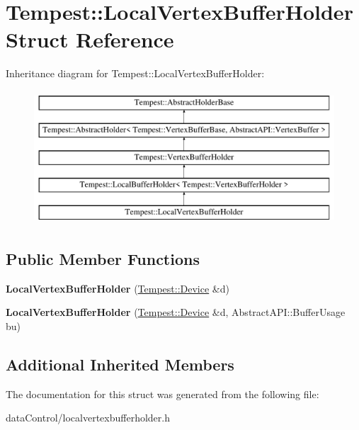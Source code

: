 \hypertarget{struct_tempest_1_1_local_vertex_buffer_holder}{\section{Tempest\+:\+:Local\+Vertex\+Buffer\+Holder Struct Reference}
\label{struct_tempest_1_1_local_vertex_buffer_holder}
}
Inheritance diagram for Tempest\+:\+:Local\+Vertex\+Buffer\+Holder\+:\begin{figure}[H]
\begin{center}
\leavevmode
\includegraphics[height=5.000000cm]{struct_tempest_1_1_local_vertex_buffer_holder}
\end{center}
\end{figure}
\subsection*{Public Member Functions}
\begin{DoxyCompactItemize}
\item 
\hypertarget{struct_tempest_1_1_local_vertex_buffer_holder_a8e2a56359037c2103e5fa33aae54ee4c}{{\bfseries Local\+Vertex\+Buffer\+Holder} (\hyperlink{class_tempest_1_1_device}{Tempest\+::\+Device} \&d)}\label{struct_tempest_1_1_local_vertex_buffer_holder_a8e2a56359037c2103e5fa33aae54ee4c}

\item 
\hypertarget{struct_tempest_1_1_local_vertex_buffer_holder_a71a00f8126b77f10b2c4f8f922125c21}{{\bfseries Local\+Vertex\+Buffer\+Holder} (\hyperlink{class_tempest_1_1_device}{Tempest\+::\+Device} \&d, Abstract\+A\+P\+I\+::\+Buffer\+Usage bu)}\label{struct_tempest_1_1_local_vertex_buffer_holder_a71a00f8126b77f10b2c4f8f922125c21}

\end{DoxyCompactItemize}
\subsection*{Additional Inherited Members}


The documentation for this struct was generated from the following file\+:\begin{DoxyCompactItemize}
\item 
data\+Control/localvertexbufferholder.\+h\end{DoxyCompactItemize}
